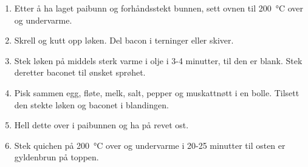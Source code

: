 \begin{enumerate}
    \item 
    Etter å ha laget paibunn og forhåndsstekt bunnen, sett ovnen til \SI{200}{\celsius} over og undervarme.
    
    \item 
    Skrell og kutt opp løken. 
    Del bacon i terninger eller skiver.
    
    \item 
    Stek løken på middels sterk varme i olje i 3-4 minutter, til den er blank.
    Stek deretter baconet til ønsket sprøhet.
    
    \item 
    Pisk sammen egg, fløte, melk, salt, pepper og muskattnøtt i en bolle.
    Tilsett den stekte løken og baconet i blandingen.
    
    \item
    Hell dette over i paibunnen og ha på revet ost. 
    
    \item
    Stek quichen på \SI{200}{\celsius} over og undervarme i 20-25 minutter til osten er gyldenbrun på toppen. 
    
\end{enumerate}